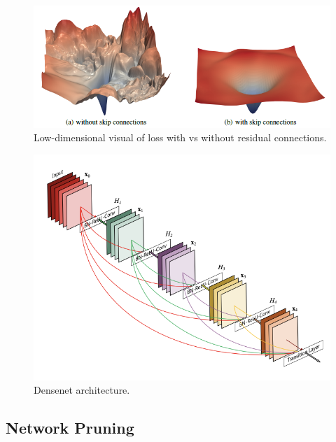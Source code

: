 \documentclass{article}
\begin{document}
    \begin{figure}[H]
      \centering 
      \includegraphics[scale=0.4]{img/02_Control/resnet_loss.png}
      \caption{Low-dimensional visual of loss with vs without residual connections. } 
      \label{fig:resnet_loss}
    \end{figure}

    \begin{figure}[H]
      \centering 
      \includegraphics[scale=0.4]{img/02_Control/densenet.png}
      \caption{Densenet architecture. } 
      \label{fig:densenet_architecture}
    \end{figure}

  \subsection{Network Pruning}
\end{document}
